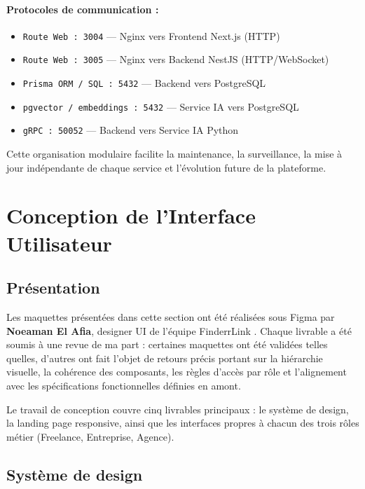 \paragraph{Protocoles de communication :}
\begin{itemize}
    \item \texttt{Route Web : 3004} — Nginx vers Frontend Next.js (HTTP)
    \item \texttt{Route Web : 3005} — Nginx vers Backend NestJS (HTTP/WebSocket)
    \item \texttt{Prisma ORM / SQL : 5432} — Backend vers PostgreSQL
    \item \texttt{pgvector / embeddings : 5432} — Service IA vers PostgreSQL
    \item \texttt{gRPC : 50052} — Backend vers Service IA Python
\end{itemize}

Cette organisation modulaire facilite la maintenance, la surveillance, la mise à jour indépendante de chaque service et l'évolution future de la plateforme.

\section{Conception de l'Interface Utilisateur}

\subsection{Présentation}

Les maquettes présentées dans cette section ont été réalisées sous Figma par
\textbf{Noeaman El Afia}, designer UI de l'équipe FinderrLink \cite{figma}. Chaque livrable
a été soumis à une revue de ma part : certaines maquettes ont été validées
telles quelles, d'autres ont fait l'objet de retours précis portant sur la
hiérarchie visuelle, la cohérence des composants, les règles d'accès par rôle
et l'alignement avec les spécifications fonctionnelles définies en amont.

Le travail de conception couvre cinq livrables principaux : le système de
design, la landing page responsive, ainsi que les interfaces propres à chacun
des trois rôles métier (Freelance, Entreprise, Agence).

\subsection{Système de design}

